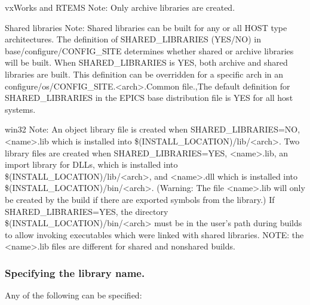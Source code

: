 vxWorks and RTEMS Note: Only archive libraries are created.

Shared libraries Note: Shared libraries can be built for any or all HOST type architectures. The definition of 
SHARED\_LIBRARIES (YES/NO) in base/configure/CONFIG\_SITE determines whether shared or archive libraries will 
be built. When SHARED\_LIBRARIES is YES, both archive and shared libraries are built. This definition can be 
overridden for a specific arch in an configure/os/CONFIG\_SITE.\textless{}arch\textgreater{}.Common file.,The default definition for 
SHARED\_LIBRARIES in the EPICS base distribution file is YES for all host systems.

win32 Note: An object library file is created when SHARED\_LIBRARIES=NO, \textless{}name\textgreater{}.lib which is installed into 
\$(INSTALL\_LOCATION)/lib/\textless{}arch\textgreater{}. Two library files are created when SHARED\_LIBRARIES=YES, \textless{}name\textgreater{}.lib, an 
import library for DLLs, which is installed into \$(INSTALL\_LOCATION)/lib/\textless{}arch\textgreater{}, and \textless{}name\textgreater{}.dll which is installed 
into \$(INSTALL\_LOCATION)/bin/\textless{}arch\textgreater{}. (Warning: The file \textless{}name\textgreater{}.lib will only be created by the build if there are 
exported symbols from the library.) If SHARED\_LIBRARIES=YES, the directory \\
\$(INSTALL\_LOCATION)/bin/\textless{}arch\textgreater{} 
must be in the user's path during builds to allow invoking executables which were linked with shared libraries. NOTE: the 
\textless{}name\textgreater{}.lib files are different for shared and nonshared builds.

\subsubsection{Specifying the library name.}

Any of the following can be specified:

